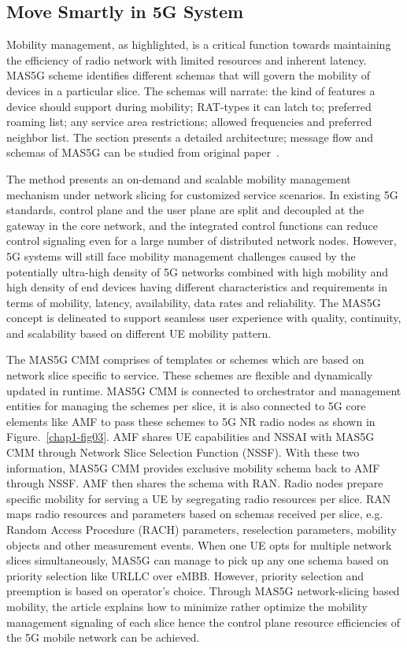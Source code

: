\begin{multicols}{2}
\begin{itemize}
\end{itemize}

\subsection{Move Smartly in 5G System} 

Mobility management, as highlighted, is a critical function towards maintaining the efficiency of radio network with limited resources and inherent latency. MAS5G scheme identifies different schemas that will govern the mobility of devices in a particular slice. The schemas will narrate: the kind of features a device should support during mobility; RAT-types it can latch to; preferred roaming list; any service area restrictions; allowed frequencies  and preferred neighbor list. The section presents a detailed architecture; message flow and schemas of MAS5G can be studied from original \hbox{paper \cite{art1-key01}.}

The method presents an on-demand and scalable mobility management mechanism under network slicing for customized service scenarios. In existing 5G standards, control plane and the user plane are split and decoupled at the gateway in the core network, and the integrated control functions can reduce control signaling even for a large number of distributed network nodes. However, 5G systems will still face mobility management challenges caused by the potentially ultra-high density of 5G networks combined with high mobility and high density of end devices having different characteristics and requirements in terms of mobility, latency, availability, data rates and reliability. The MAS5G concept is delineated to support seamless user experience with quality, continuity, and scalability based on different UE mobility pattern.

The MAS5G CMM comprises of templates or schemes which are based on network slice specific to service. These schemes are flexible and dynamically updated in runtime. MAS5G CMM is connected to orchestrator and management entities for managing the schemes per slice, it is also connected to 5G core elements like AMF to pass these schemes to 5G NR radio nodes as shown in Figure.~\ref{chap1-fig03}. AMF shares UE capabilities and NSSAI with MAS5G CMM through Network Slice Selection Function (NSSF). With these two information, MAS5G CMM provides exclusive mobility schema back to AMF through NSSF. AMF then shares the schema with RAN. Radio nodes prepare specific mobility for serving a UE by segregating radio resources per slice. RAN maps radio resources and parameters based on schemas received per slice, e.g. Random Access Procedure (RACH) parameters, reselection parameters, mobility objects and other measurement events. When one UE opts for multiple network slices simultaneously, MAS5G can manage to pick up any one schema based on priority selection like URLLC over eMBB. However, priority selection and preemption is based on operator’s choice. Through MAS5G network-slicing based mobility, the article explains how to minimize rather optimize the mobility management signaling of each slice hence the control plane resource efficiencies of the 5G mobile network can be achieved. 
\end{multicols}
